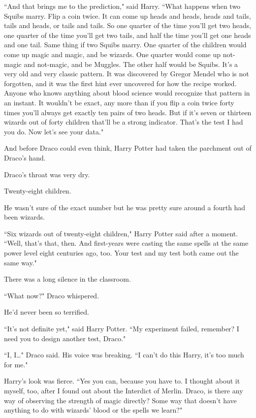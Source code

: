 ``And that brings me to the prediction," said Harry. ``What happens when two Squibs marry. Flip a coin twice. It can come up heads and heads, heads and tails, tails and heads, or tails and tails. So one quarter of the time you'll get two heads, one quarter of the time you'll get two tails, and half the time you'll get one heads and one tail. Same thing if two Squibs marry. One quarter of the children would come up magic and magic, and be wizards. One quarter would come up not-magic and not-magic, and be Muggles. The other half would be Squibs. It's a very old and very classic pattern. It was discovered by Gregor Mendel who is not forgotten, and it was the first hint ever uncovered for how the recipe worked. Anyone who knows anything about blood science would recognize that pattern in an instant. It wouldn't be exact, any more than if you flip a coin twice forty times you'll always get exactly ten pairs of two heads. But if it's seven or thirteen wizards out of forty children that'll be a strong indicator. That's the test I had you do. Now let's see your data."

And before Draco could even think, Harry Potter had taken the parchment out of Draco's hand.

Draco's throat was very dry.

Twenty-eight children.

He wasn't sure of the exact number but he was pretty sure around a fourth had been wizards.

``Six wizards out of twenty-eight children," Harry Potter said after a moment. ``Well, that's that, then. And first-years were casting the same spells at the same power level eight centuries ago, too. Your test and my test both came out the same way."

There was a long silence in the classroom.

``What now?" Draco whispered.

He'd never been so terrified.

``It's not definite yet," said Harry Potter. ``My experiment failed, remember? I need you to design another test, Draco."

``I, I{\ldots}" Draco said. His voice was breaking. ``I can't do this Harry, it's too much for me."

Harry's look was fierce. ``Yes you can, because you have to. I thought about it myself, too, after I found out about the Interdict of Merlin. Draco, is there any way of observing the strength of magic directly? Some way that doesn't have anything to do with wizards' blood or the spells we learn?"

